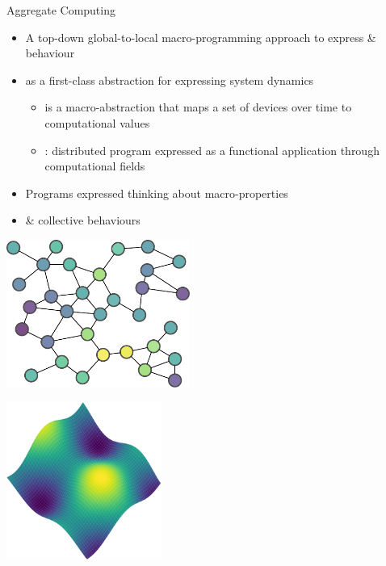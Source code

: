 \documentclass[9pt, aspectratio=169, handout]{beamer}
\begin{document}
\begin{frame}{Aggregate Computing}
  \begin{cardTiny}
    \begin{itemize}
      \item <1-> A top-down global-to-local macro-programming approach to express  \&  behaviour~\cite{DBLP:conf/saso/BealVPD16}
      \item <2->  as a first-class abstraction for expressing system dynamics
      \begin{itemize}
        \item is a macro-abstraction that maps a set of devices over time to computational values
        \item [\success{\faThumbsUp}] : distributed program expressed as a functional application through computational fields
      \end{itemize}
    \end{itemize}
  \end{cardTiny}
  \begin{multicols}{2}
    \begin{card}[Benefits]
      \begin{itemize}
        \item Programs expressed thinking about macro-properties
        \item {} \&  collective behaviours
      \end{itemize}
    \end{card}
    \begin{cardTiny}
      \includegraphics[width=0.45\textwidth]{img/discrete.pdf}
      \hfill
      \parbox[c]{1em}{\color{primary}\vspace*{-6em}\Large \faArrowRight}
      \hfill
      \includegraphics[width=0.38\textwidth]{img/viridis-result.png}
    \end{cardTiny}
  \end{multicols}
\end{frame}
\end{document}

